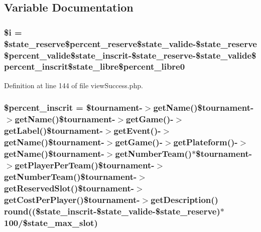 \subsection{Variable Documentation}
\hypertarget{backend_2modules_2tournament_2templates_2view_success_8php_a83018d9153d17d91fbcf3bc10158d34f}{
\subsubsection[{\$i}]{\setlength{\rightskip}{0pt plus 5cm}\${\bf i} = \$state\-\_\-reserve\$percent\-\_\-reserve\$state\-\_\-valide-\/\$state\-\_\-reserve\$percent\-\_\-valide\$state\-\_\-inscrit-\/\$state\-\_\-reserve-\/\$state\-\_\-valide\$percent\-\_\-inscrit\$state\-\_\-libre\$percent\-\_\-libre0}}\label{backend_2modules_2tournament_2templates_2view_success_8php_a83018d9153d17d91fbcf3bc10158d34f}


Definition at line 144 of file view\-Success.\-php.

\hypertarget{backend_2modules_2tournament_2templates_2view_success_8php_ac03c20507069eb4aa471480a173f33ba}{
\subsubsection[{\$percent\-\_\-inscrit}]{\setlength{\rightskip}{0pt plus 5cm}\$percent\-\_\-inscrit = \$tournament-\/$>$get\-Name()\$tournament-\/$>$get\-Name()\$tournament-\/$>$get\-Game()-\/$>$get\-Label()\$tournament-\/$>$get\-Event()-\/$>$get\-Name()\$tournament-\/$>$get\-Game()-\/$>$get\-Plateform()-\/$>$get\-Name()\$tournament-\/$>$get\-Number\-Team()$\ast$\$tournament-\/$>$get\-Player\-Per\-Team()\$tournament-\/$>$get\-Number\-Team()\$tournament-\/$>$get\-Reserved\-Slot()\$tournament-\/$>$get\-Cost\-Per\-Player()\$tournament-\/$>$get\-Description() round((\$state\-\_\-inscrit-\/\$state\-\_\-valide-\/\$state\-\_\-reserve)$\ast$100/\$state\-\_\-max\-\_\-slot)}}\label{backend_2modules_2tournament_2templates_2view_success_8php_ac03c20507069eb4aa471480a173f33ba}


